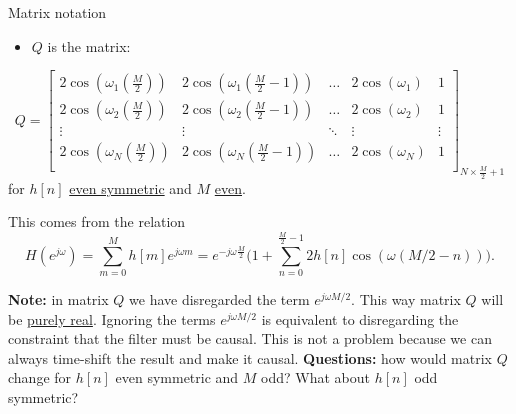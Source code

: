 \documentclass[10pt]{beamer}
\begin{document}
\begin{frame}{Matrix notation}
	\begin{itemize}
		\item $Q$ is the matrix:
	\end{itemize}
		\begin{equation*}
			Q = \begin{bmatrix}
			2\cos(\omega_1(\frac{M}{2})) & 2\cos(\omega_1(\frac{M}{2}-1)) &\ldots & 2\cos(\omega_1) & 1 \\
			2\cos(\omega_2(\frac{M}{2})) & 2\cos(\omega_2(\frac{M}{2}-1)) & \ldots & 2\cos(\omega_2) & 1 \\
			\vdots & \vdots & \ddots & \vdots & \vdots \\
			2\cos(\omega_N(\frac{M}{2})) & 2\cos(\omega_N(\frac{M}{2}-1)) & \ldots & 2\cos(\omega_N) & 1	\\		
			\end{bmatrix}_{N\times \frac{M}{2} + 1}
		\end{equation*}
		for $h[n]$ \underline{even symmetric} and $M$ \underline{even}.
		
		This comes from the relation
		\begin{equation*}
		H(e^{j\omega}) = \sum_{m = 0}^{M}h[m]e^{j\omega m} = e^{-j\omega\frac{M}{2}}\bigg(1 + \displaystyle\sum_{n = 0}^{\frac{M}{2}-1}2h[n]\cos(\omega(M/2-n))\bigg). \tag{DTFT of symmetryic FIR $h[n]$}
		\end{equation*}

		\vspace{0.25cm}
		\textbf{Note:} in matrix $Q$ we have disregarded the term $e^{j\omega M/2}$. This way matrix $Q$ will be \underline{purely real}. Ignoring the terms $e^{j\omega M/2}$ is equivalent to disregarding the constraint that the filter must be causal. This is not a problem because we can always time-shift the result and make it causal.
		\pause 
		\textbf{Questions:} how would matrix $Q$ change for $h[n]$ even symmetric and $M$ odd? What about $h[n]$ odd symmetric?
\end{frame}
\end{document}
